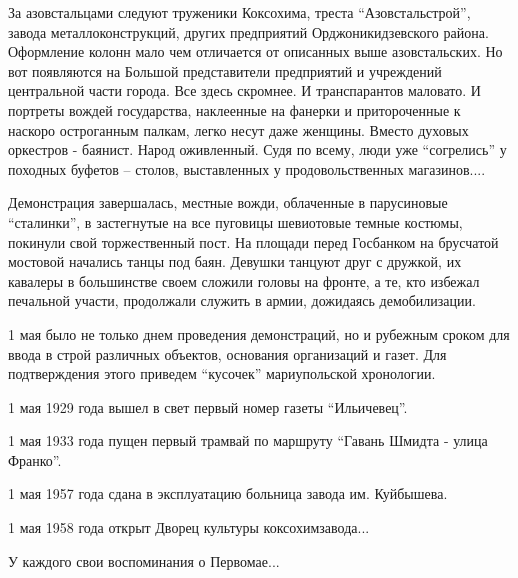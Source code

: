 За азовстальцами следуют труженики Коксохима, треста \enquote{Азовстальстрой}, завода
металлоконструкций, других предприятий Орджоникидзевского района. Оформление
колонн мало чем отличается от описанных выше азовстальских.  Но вот появляются
на Большой представители предприятий и учреждений центральной части города. Все
здесь скромнее. И транспарантов маловато. И портреты вождей государства,
наклеенные на фанерки и притороченные к наскоро остроганным палкам, легко несут
даже женщины. Вместо духовых оркестров - баянист. Народ оживленный. Судя по
всему, люди уже \enquote{согрелись} у походных буфетов – столов, выставленных у
продовольственных магазинов....

Демонстрация завершалась, местные вожди, облаченные в парусиновые \enquote{сталинки}, в
застегнутые на все пуговицы шеви­отовые темные костюмы, покинули свой
торжественный пост. На площади перед Госбанком на брусчатой мостовой начались
танцы под баян. Девушки танцуют друг с дружкой, их кавалеры в большинстве
своем сложили головы на фронте, а те, кто избежал печальной участи, продолжали
служить в армии, дожидаясь демобилизации.

1 мая было не только днем проведения демонстраций, но и рубежным сроком для
ввода в строй различных объектов, основания организаций и газет. Для
подтверждения этого приведем \enquote{кусочек} мариупольской хронологии.

1 мая 1929 года вышел в свет первый номер газеты \enquote{Ильичевец}.

1 мая 1933 года пущен первый трамвай по маршруту \enquote{Гавань Шмидта - улица
Франко}.

1 мая 1957 года сдана в эксплуатацию больница завода им. Куйбышева.

1 мая 1958 года открыт Дворец культуры коксохимзавода...

У каждого свои воспоминания о Первомае... 
